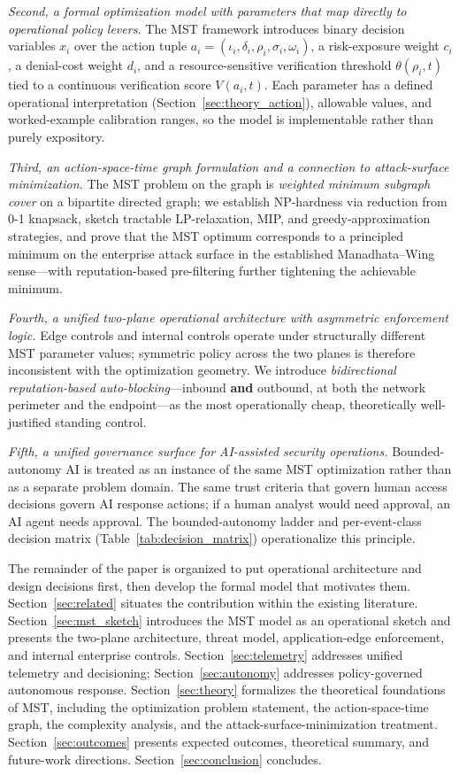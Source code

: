 \documentclass[acmlarge]{acmart}
\begin{document}
\textit{Second, a formal optimization model with parameters that map directly
to operational policy levers.} The MST framework introduces binary decision
variables $x_i$ over the action tuple
$a_i = (\iota_i, \delta_i, \rho_i, \sigma_i, \omega_i)$, a risk-exposure weight
$c_i$, a denial-cost weight $d_i$, and a resource-sensitive verification
threshold $\theta(\rho_i, t)$ tied to a continuous verification score
$V(a_i, t)$. Each parameter has a defined operational interpretation
(Section~\ref{sec:theory_action}), allowable values, and worked-example
calibration ranges, so the model is implementable rather than purely
expository.

\textit{Third, an action-space-time graph formulation and a connection to
attack-surface minimization.} The MST problem on the graph is
\textit{weighted minimum subgraph cover} on a bipartite directed graph; we
establish NP-hardness via reduction from 0-1 knapsack, sketch tractable
LP-relaxation, MIP, and greedy-approximation strategies, and prove that the
MST optimum corresponds to a principled minimum on the enterprise attack
surface in the established Manadhata--Wing sense---with reputation-based
pre-filtering further tightening the achievable minimum.

\textit{Fourth, a unified two-plane operational architecture with
asymmetric enforcement logic.} Edge controls and internal controls operate
under structurally different MST parameter values; symmetric policy across
the two planes is therefore inconsistent with the optimization geometry. We
introduce \textit{bidirectional reputation-based auto-blocking}---inbound
\textbf{and} outbound, at both the network perimeter and the endpoint---as
the most operationally cheap, theoretically well-justified standing control.

\textit{Fifth, a unified governance surface for AI-assisted security
operations.} Bounded-autonomy AI is treated as an instance of the same MST
optimization rather than as a separate problem domain. The same trust
criteria that govern human access decisions govern AI response actions; if a
human analyst would need approval, an AI agent needs approval. The
bounded-autonomy ladder and per-event-class decision matrix
(Table~\ref{tab:decision_matrix}) operationalize this principle.

The remainder of the paper is organized to put operational architecture and
design decisions first, then develop the formal model that motivates them.
Section~\ref{sec:related} situates the contribution within the existing
literature. Section~\ref{sec:mst_sketch} introduces the MST model as an
operational sketch and presents the two-plane architecture, threat model,
application-edge enforcement, and internal enterprise controls.
Section~\ref{sec:telemetry} addresses unified telemetry and decisioning;
Section~\ref{sec:autonomy} addresses policy-governed autonomous response.
Section~\ref{sec:theory} formalizes the theoretical foundations of MST,
including the optimization problem statement, the action-space-time graph,
the complexity analysis, and the attack-surface-minimization treatment.
Section~\ref{sec:outcomes} presents expected outcomes, theoretical summary,
and future-work directions. Section~\ref{sec:conclusion} concludes.
\end{document}
